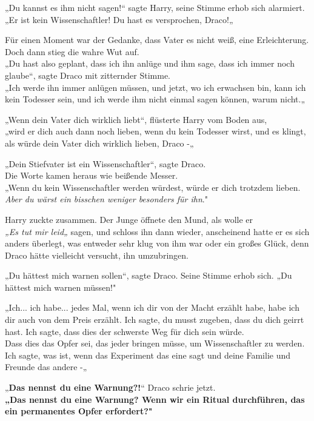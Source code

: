 {„Du kannst es ihm nicht sagen!“ sagte Harry, seine Stimme erhob sich alarmiert.\\ „Er ist kein Wissenschaftler! Du hast es versprochen, Draco!„

Für einen Moment war der Gedanke, dass Vater es nicht weiß, eine Erleichterung.\\ Doch dann stieg die wahre Wut auf.\\ „Du hast also geplant, dass ich ihn anlüge und ihm sage, dass ich immer noch glaube“, sagte Draco mit zitternder Stimme.\\ „Ich werde ihn immer anlügen müssen, und jetzt, wo ich erwachsen bin, kann ich kein Todesser sein, und ich werde ihm nicht einmal sagen können, warum nicht.„

„Wenn dein Vater dich wirklich liebt“, flüsterte Harry vom Boden aus,\\ „wird er dich auch dann noch lieben, wenn du kein Todesser wirst, und es klingt, als würde dein Vater dich wirklich lieben, Draco -„

„Dein Stiefvater ist ein Wissenschaftler“, sagte Draco.\\ Die Worte kamen heraus wie beißende Messer.\\ „Wenn du kein Wissenschaftler werden würdest, würde er dich trotzdem lieben.\\ \emph{Aber du wärst ein bisschen weniger besonders für ihn}."

Harry zuckte zusammen. Der Junge öffnete den Mund, als wolle er\\ \emph{„Es tut mir leid„} sagen, und schloss ihn dann wieder, anscheinend hatte er es sich anders überlegt, was entweder sehr klug von ihm war oder ein großes Glück, denn Draco hätte vielleicht versucht, ihn umzubringen.

„Du hättest mich warnen sollen“, sagte Draco. Seine Stimme erhob sich. „Du hättest mich warnen müssen!"

„Ich... ich habe... jedes Mal, wenn ich dir von der Macht erzählt habe, habe ich dir auch von dem Preis erzählt. Ich sagte, du musst zugeben, dass du dich geirrt hast. Ich sagte, dass dies der schwerste Weg für dich sein würde.\\ Dass dies das Opfer sei, das jeder bringen müsse, um Wissenschaftler zu werden. Ich sagte, was ist, wenn das Experiment das eine sagt und deine Familie und Freunde das andere -„

„\textbf{Das nennst du eine Warnung?!}“ Draco schrie jetzt.\\ \textbf{„Das nennst du eine Warnung? Wenn wir ein Ritual durchführen, das ein permanentes Opfer erfordert?"}

}
